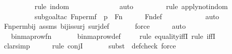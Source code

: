 \begin{isabellebody}
\ \ \ \ \ \ \ \ \ \isamarkupfalse%
{\isacharparenleft}{\kern0pt}rule\ indom{\isacharparenright}{\kern0pt}\isanewline
\ \ \ \ \ \ \ \ \ \ \ \ \isamarkupfalse%
\ auto{\isacharbrackleft}{\kern0pt}{}{\isacharbrackright}{\kern0pt}\isanewline
\ \ \ \ \ \ \ \ \isamarkupfalse%
{\isacharparenleft}{\kern0pt}rule\ apply{\isacharunderscore}{\kern0pt}not{}{\isacharunderscore}{\kern0pt}indom{\isacharparenright}{\kern0pt}\isanewline
\ \ \ \ \ \ \ \ \ \isamarkupfalse%
{\isacharparenleft}{\kern0pt}subgoal{\isacharunderscore}{\kern0pt}tac\ {\isachardoublequoteopen}Fn{\isacharunderscore}{\kern0pt}perm{\isacharprime}{\kern0pt}{\isacharparenleft}{\kern0pt}f{\isacharparenright}{\kern0pt}\ {\isacharbackquote}{\kern0pt}\ p\ {\isasymin}\ Fn{\isachardoublequoteclose}{\isacharparenright}{\kern0pt}\isanewline
\ \ \ \ \isamarkupfalse%
\ Fn{\isacharunderscore}{\kern0pt}def\isanewline
\ \ \ \ \ \ \ \ \ \ \isamarkupfalse%
\ auto{\isacharbrackleft}{\kern0pt}{}{\isacharbrackright}{\kern0pt}\isanewline
\ \ \ \ \isamarkupfalse%
\ Fn{\isacharunderscore}{\kern0pt}perm{\isacharprime}{\kern0pt}{\isacharunderscore}{\kern0pt}bij\ assms\ bij{\isacharunderscore}{\kern0pt}is{\isacharunderscore}{\kern0pt}surj\ surj{\isacharunderscore}{\kern0pt}def\isanewline
\ \ \ \ \ \isamarkupfalse%
\ force\isanewline
\ \ \ \ \isamarkupfalse%
\ auto\isanewline
\ \ \isamarkupfalse%
\ \isamarkupfalse%
\ {\isachardoublequoteopen}{\isachardot}{\kern0pt}{\isachardot}{\kern0pt}{\isachardot}{\kern0pt}\ {\isacharequal}{\kern0pt}\ binmap{\isacharunderscore}{\kern0pt}row{\isacharprime}{\kern0pt}{\isacharparenleft}{\kern0pt}f{\isacharbackquote}{\kern0pt}n{\isacharparenright}{\kern0pt}{\isachardoublequoteclose}\ \isanewline
\ \ \ \ \isamarkupfalse%
\ binmap{\isacharunderscore}{\kern0pt}row{\isacharprime}{\kern0pt}{\isacharunderscore}{\kern0pt}def\isanewline
\ \ \ \ \isamarkupfalse%
{\isacharparenleft}{\kern0pt}rule\ equality{\isacharunderscore}{\kern0pt}iffI{\isacharcomma}{\kern0pt}\ rule\ iffI{\isacharparenright}{\kern0pt}\isanewline
\ \ \ \ \ \isamarkupfalse%
\ clarsimp\isanewline
\ \ \ \ \ \isamarkupfalse%
{\isacharparenleft}{\kern0pt}rule\ conjI{\isacharparenright}{\kern0pt}\isanewline
\ \ \ \ \ \ \isamarkupfalse%
{\isacharparenleft}{\kern0pt}subst\ {\isacharparenleft}{\kern0pt}{}{\isacharparenright}{\kern0pt}\ def{\isacharunderscore}{\kern0pt}check{\isacharcomma}{\kern0pt}\ force{\isacharparenright}{\kern0pt}\isanewline

\end{isabellebody}
